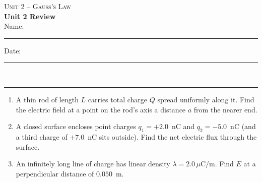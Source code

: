 \documentclass[11pt,letterpaper]{article}
\begin{document}
{\small\textsc{Unit 2 -- Gauss's Law}}\\[2pt]{\Large\bfseries Unit 2 Review}\\[8pt]Name: \rule{2.4in}{0.4pt} \hfill Date: \rule{1.4in}{0.4pt}\\[4pt]\hrule\vspace{10pt}{\small\itshape Placeholder worksheet for the site prototype. Free for classroom use.}\vspace{6pt}
\begin{enumerate}[leftmargin=*,itemsep=10pt]
\item A thin rod of length $L$ carries total charge $Q$ spread uniformly along it. Find the electric field at a point on the rod's axis a distance $a$ from the nearer end.
\vspace{2.2in}
\item A closed surface encloses point charges $q_1 = +2.0$~nC and $q_2 = -5.0$~nC (and a third charge of $+7.0$~nC sits outside). Find the net electric flux through the surface.
\vspace{2.2in}
\item An infinitely long line of charge has linear density $\lambda = 2.0\,\mu\text{C/m}$. Find $E$ at a perpendicular distance of $0.050$~m.
\vspace{2.2in}
\end{enumerate}
\end{document}
